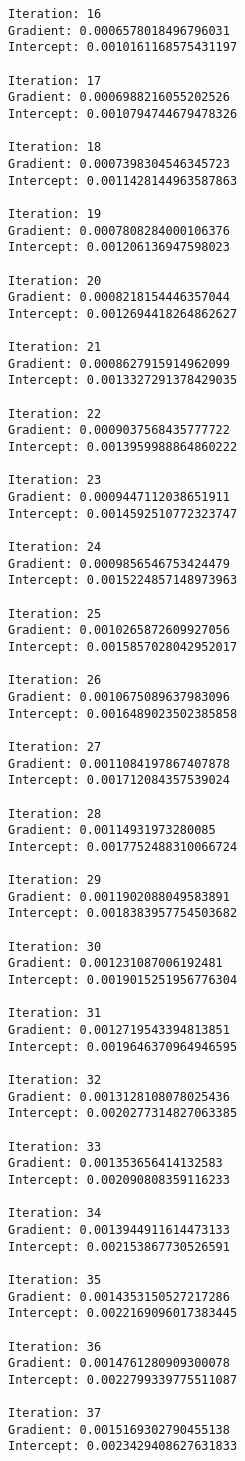 \documentclass[11pt]{article}
\begin{document}
\begin{Verbatim}[commandchars=\\\{\}]
Iteration: 16 
Gradient: 0.0006578018496796031 
Intercept: 0.0010161168575431197 

Iteration: 17 
Gradient: 0.0006988216055202526 
Intercept: 0.0010794744679478326 

Iteration: 18 
Gradient: 0.0007398304546345723 
Intercept: 0.0011428144963587863 

Iteration: 19 
Gradient: 0.0007808284000106376 
Intercept: 0.001206136947598023 

Iteration: 20 
Gradient: 0.0008218154446357044 
Intercept: 0.0012694418264862627 

Iteration: 21 
Gradient: 0.0008627915914962099 
Intercept: 0.0013327291378429035 

Iteration: 22 
Gradient: 0.0009037568435777722 
Intercept: 0.0013959988864860222 

Iteration: 23 
Gradient: 0.0009447112038651911 
Intercept: 0.0014592510772323747 

Iteration: 24 
Gradient: 0.0009856546753424479 
Intercept: 0.0015224857148973963 

Iteration: 25 
Gradient: 0.0010265872609927056 
Intercept: 0.0015857028042952017 

Iteration: 26 
Gradient: 0.0010675089637983096 
Intercept: 0.0016489023502385858 

Iteration: 27 
Gradient: 0.0011084197867407878 
Intercept: 0.001712084357539024 

Iteration: 28 
Gradient: 0.00114931973280085 
Intercept: 0.0017752488310066724 

Iteration: 29 
Gradient: 0.0011902088049583891 
Intercept: 0.0018383957754503682 

Iteration: 30 
Gradient: 0.001231087006192481 
Intercept: 0.0019015251956776304 

Iteration: 31 
Gradient: 0.0012719543394813851 
Intercept: 0.0019646370964946595 

Iteration: 32 
Gradient: 0.0013128108078025436 
Intercept: 0.0020277314827063385 

Iteration: 33 
Gradient: 0.001353656414132583 
Intercept: 0.002090808359116233 

Iteration: 34 
Gradient: 0.0013944911614473133 
Intercept: 0.002153867730526591 

Iteration: 35 
Gradient: 0.0014353150527217286 
Intercept: 0.0022169096017383445 

Iteration: 36 
Gradient: 0.0014761280909300078 
Intercept: 0.0022799339775511087 

Iteration: 37 
Gradient: 0.0015169302790455138 
Intercept: 0.0023429408627631833 


\end{Verbatim}
\end{document}
